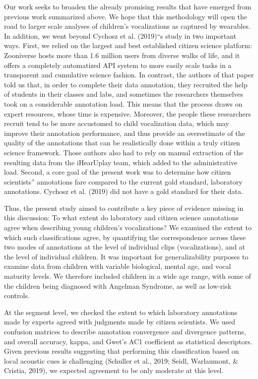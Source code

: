 \documentclass[english,,man,floatsintext]{apa6}
\begin{document}
Our work seeks to broaden the already promising results that have emerged from previous work summarized above. We hope that this methodology will open the road to larger scale analyses of children's vocalizations as captured by wearables. In addition, we went beyond Cychosz et al. (2019)\enquote{s study in two important ways. First, we relied on the largest and best established citizen science platform: Zooniverse hosts more than 1.6 million users from diverse walks of life, and it offers a completely automatized API system to more easily scale tasks in a transparent and cumulative science fashion. In contrast, the authors of that paper told us that, in order to complete their data annotation, they recruited the help of students in their classes and labs, and sometimes the researchers themselves took on a considerable annotation load. This means that the process draws on expert resources, whose time is expensive. Moreover, the people these researchers recruit tend to be more accustomed to child vocalization data, which may improve their annotation performance, and thus provide an overestimate of the quality of the annotations that can be realistically done within a truly citizen science framework. Those authors also had to rely on manual extraction of the resulting data from the iHearUplay team, which added to the administrative load. Second, a core goal of the present work was to determine how citizen scientists} annotations fare compared to the current gold standard, laboratory annotations. Cychosz et al. (2019) did not have a gold standard for their data.

Thus, the present study aimed to contribute a key piece of evidence missing in this discussion: To what extent do laboratory and citizen science annotations agree when describing young children's vocalizations? We examined the extent to which such classifications agree, by quantifying the correspondence across these two modes of annotations at the level of individual clips (vocalizations), and at the level of individual children. It was important for generalizability purposes to examine data from children with variable biological, mental age, and vocal maturity levels. We therefore included children in a wide age range, with some of the children being diagnosed with Angelman Syndrome, as well as low-risk controls.

At the segment level, we checked the extent to which laboratory annotations made by experts agreed with judgments made by citizen scientists. We used confusion matrices to describe annotation convergence and divergence patterns, and overall accuracy, kappa, and Gwet's AC1 coefficient as statistical descriptors. Given previous results suggesting that performing this classification based on local acoustic cues is challenging (Schuller et al., 2019; Seidl, Warlaumont, \& Cristia, 2019), we expected agreement to be only moderate at this level.
\end{document}
